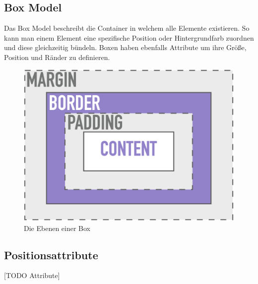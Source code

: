 \documentclass{article}
\begin{document}
\begin{itemize}
	\section{Box Model}
	Das Box Model beschreibt die Container in welchem alle Elemente existieren. So kann man einem Element eine spezifische Position oder Hintergrundfarb zuordnen und diese gleichzeitig bündeln. Boxen haben ebenfalls Attribute um ihre Größe, Position und Ränder zu definieren.
	\begin{figure}[H]
	\centering
	\includegraphics{Bilder/box.png}
	\caption{Die Ebenen einer Box}
	\end{figure}
	
	\subsection{Positionsattribute}
	[TODO Attribute]

\end{itemize}
\end{document}
